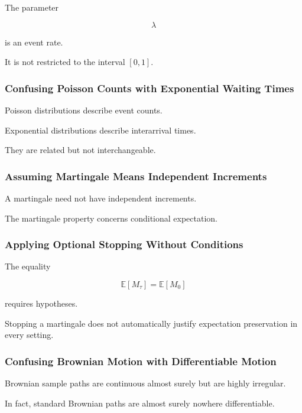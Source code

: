 The parameter

\[
\lambda
\]

is an event rate.

It is not restricted to the interval \([0,1]\).

\subsubsection{Confusing Poisson Counts with Exponential Waiting Times}

Poisson distributions describe event counts.

Exponential distributions describe interarrival times.

They are related but not interchangeable.

\subsubsection{Assuming Martingale Means Independent Increments}

A martingale need not have independent increments.

The martingale property concerns conditional expectation.

\subsubsection{Applying Optional Stopping Without Conditions}

The equality

\[
\mathbb{E}[M_\tau]
=
\mathbb{E}[M_0]
\]

requires hypotheses.

Stopping a martingale does not automatically justify expectation
preservation in every setting.

\subsubsection{Confusing Brownian Motion with Differentiable Motion}

Brownian sample paths are continuous almost surely but are highly
irregular.

In fact, standard Brownian paths are almost surely nowhere
differentiable.

